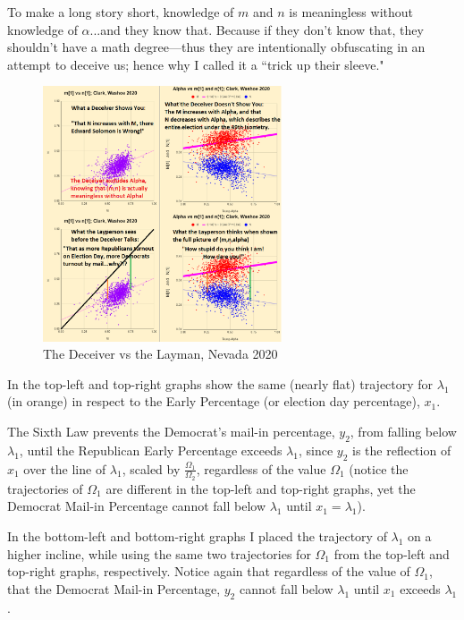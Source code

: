 To make a long story short, knowledge of $m$ and $n$ is meaningless without knowledge of $\alpha$...and they know that. Because if they don't know that, they shouldn't have a math degree---thus they are intentionally obfuscating in an attempt to deceive us; hence why I called it a ``trick up their sleeve."
\begin{figure}[bp!]
\begin{center}
\caption{The Deceiver vs the Layman, Nevada 2020}
\includegraphics[width=200pt]{MvsN Clark.png}
\end{center}
\end{figure}
\newpage
\newpage
In the top-left and top-right graphs show the same (nearly flat) trajectory for $\lambda_{1}$ (in orange) in respect to the Early Percentage (or election day percentage), $x_{1}$.

The Sixth Law prevents the Democrat's mail-in percentage, $y_{2}$, from falling below $\lambda_{1}$, until the Republican Early Percentage exceeds $\lambda_{1}$, since $y_{2}$ is the reflection of $x_{1}$ over the line of $\lambda_{1}$, scaled by $\frac{\Omega_{1}}{\Omega_{2}}$, regardless of the value $\Omega_{1}$ (notice the trajectories of $\Omega_{1}$ are different in the top-left and top-right graphs, yet the Democrat Mail-in Percentage cannot fall below $\lambda_{1}$ until $x_{1}=\lambda_{1}$).

In the bottom-left and bottom-right graphs I placed the trajectory of $\lambda_{1}$ on a higher incline, while using the same two trajectories for $\Omega_{1}$ from the top-left and top-right graphs, respectively. Notice again that regardless of the value of $\Omega_{1}$, that the Democrat Mail-in Percentage, $y_{2}$ cannot fall below $\lambda_{1}$ until $x_{1}$ exceeds $\lambda_{1}$. 

